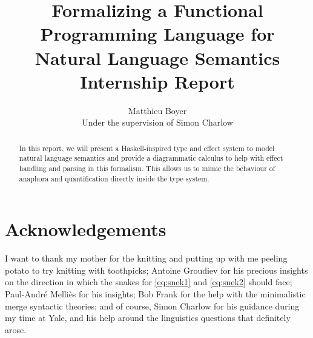 \documentclass[math, english, info]{tcart}
\title{Formalizing a Functional Programming Language for Natural Language Semantics\\ {\small Internship Report}}
\author{Matthieu Boyer \\ {\small Under the supervision of Simon Charlow}}
\begin{document}
\maketitle

\begin{abstract}
	In this report, we will present a Haskell-inspired type and effect system to
	model natural language semantics and provide a diagrammatic calculus to help
	with effect handling and parsing in this formalism.
	This allows us to mimic the behaviour of anaphora and quantification directly
	inside the type system.
\end{abstract}

\section*{Acknowledgements}
I want to thank my mother for the knitting and putting up
with me peeling potato to try knitting with toothpicks; Antoine Groudiev for
his precious insights on the direction in which the snakes for
\eqref{eq:snek1} and \eqref{eq:snek2} should face;
Paul-André Melliès for his insights; Bob Frank for the help with the
minimalistic merge syntactic theories; and of course, Simon Charlow for his
guidance during my time at Yale, and his help around the linguistics questions
that definitely arose.













\clearpage
\appendix



\end{document}
